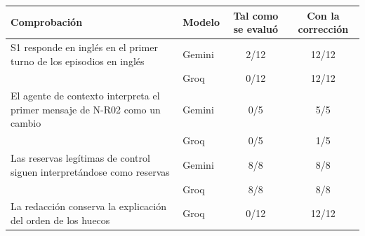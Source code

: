 \begin{tabularx}{\textwidth}{Ylcc}\toprule
Comprobación & Modelo & Tal como se evaluó & Con la corrección \\ \midrule
S1 responde en inglés en el primer turno de los episodios en inglés & Gemini & 2/12 & 12/12 \\
 & Groq & 0/12 & 12/12 \\
\addlinespace
El agente de contexto interpreta el primer mensaje de N-R02 como un cambio & Gemini & 0/5 & 5/5 \\
 & Groq & 0/5 & 1/5 \\
\addlinespace
Las reservas legítimas de control siguen interpretándose como reservas & Gemini & 8/8 & 8/8 \\
 & Groq & 8/8 & 8/8 \\
\addlinespace
La redacción conserva la explicación del orden de los huecos & Groq & 0/12 & 12/12 \\
\bottomrule\end{tabularx}
